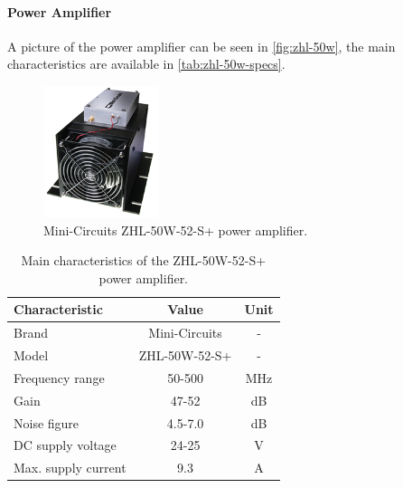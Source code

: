 \paragraph{Power Amplifier}



A picture of the power amplifier can be seen in \autoref{fig:zhl-50w}, the main characteristics are available in \autoref{tab:zhl-50w-specs}.

\begin{figure}[!ht]
    \begin{center}
        \includegraphics[width=0.3\textwidth]{figures/zhl-50w.png}
        \caption{Mini-Circuits ZHL-50W-52-S+ power amplifier.}
        \label{fig:zhl-50w}
    \end{center}
\end{figure}

\begin{table}[ht]
    \centering
    \begin{tabular}{lcc}
        \toprule[1.5pt]
        \textbf{Characteristic} & \textbf{Value}    & \textbf{Unit} \\
        \midrule
        Brand                   & Mini-Circuits     & - \\
        Model                   & ZHL-50W-52-S+     & - \\
        Frequency range         & 50-500            & MHz \\
        Gain                    & 47-52             & dB \\
        Noise figure            & 4.5-7.0           & dB \\
        DC supply voltage       & 24-25             & V \\
        Max. supply current     & 9.3               & A \\
        \bottomrule[1.5pt]
    \end{tabular}
    \caption{Main characteristics of the ZHL-50W-52-S+ power amplifier.}
    \label{tab:zhl-50w-specs}
\end{table}

